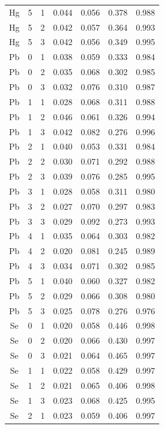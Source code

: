 \documentclass[ms, hidelinks]{uncgdissertationexp3}
\theoremstyle{plain}
\theoremstyle{definition}
\theoremstyle{remark}
\begin{document}
\begin{longtable}{ccccccc}
  Hg & 5 & 1 & 0.044 & 0.056 & 0.378 & 0.988\\
  \rowcolor{gray!6}  Hg & 5 & 2 & 0.042 & 0.057 & 0.364 & 0.993\\
  Hg & 5 & 3 & 0.042 & 0.056 & 0.349 & 0.995\\
  \rowcolor{gray!6}  Pb & 0 & 1 & 0.038 & 0.059 & 0.333 & 0.984\\
  Pb & 0 & 2 & 0.035 & 0.068 & 0.302 & 0.985\\
  \rowcolor{gray!6}  Pb & 0 & 3 & 0.032 & 0.076 & 0.310 & 0.987\\
  Pb & 1 & 1 & 0.028 & 0.068 & 0.311 & 0.988\\
  \rowcolor{gray!6}  Pb & 1 & 2 & 0.046 & 0.061 & 0.326 & 0.994\\
  Pb & 1 & 3 & 0.042 & 0.082 & 0.276 & 0.996\\
  \rowcolor{gray!6}  Pb & 2 & 1 & 0.040 & 0.053 & 0.331 & 0.984\\
  Pb & 2 & 2 & 0.030 & 0.071 & 0.292 & 0.988\\
  \rowcolor{gray!6}  Pb & 2 & 3 & 0.039 & 0.076 & 0.285 & 0.995\\
  Pb & 3 & 1 & 0.028 & 0.058 & 0.311 & 0.980\\
  \rowcolor{gray!6}  Pb & 3 & 2 & 0.027 & 0.070 & 0.297 & 0.983\\
  Pb & 3 & 3 & 0.029 & 0.092 & 0.273 & 0.993\\
  \rowcolor{gray!6}  Pb & 4 & 1 & 0.035 & 0.064 & 0.303 & 0.982\\
  Pb & 4 & 2 & 0.020 & 0.081 & 0.245 & 0.989\\
  \rowcolor{gray!6}  Pb & 4 & 3 & 0.034 & 0.071 & 0.302 & 0.985\\
  Pb & 5 & 1 & 0.040 & 0.060 & 0.327 & 0.982\\
  \rowcolor{gray!6}  Pb & 5 & 2 & 0.029 & 0.066 & 0.308 & 0.980\\
  Pb & 5 & 3 & 0.025 & 0.078 & 0.276 & 0.976\\
  \rowcolor{gray!6}  Se & 0 & 1 & 0.020 & 0.058 & 0.446 & 0.998\\
  Se & 0 & 2 & 0.020 & 0.066 & 0.430 & 0.997\\
  \rowcolor{gray!6}  Se & 0 & 3 & 0.021 & 0.064 & 0.465 & 0.997\\
  Se & 1 & 1 & 0.022 & 0.058 & 0.429 & 0.997\\
  \rowcolor{gray!6}  Se & 1 & 2 & 0.021 & 0.065 & 0.406 & 0.998\\
  Se & 1 & 3 & 0.023 & 0.068 & 0.425 & 0.995\\
  \rowcolor{gray!6}  Se & 2 & 1 & 0.023 & 0.059 & 0.406 & 0.997\\

\end{longtable}
\end{document}
